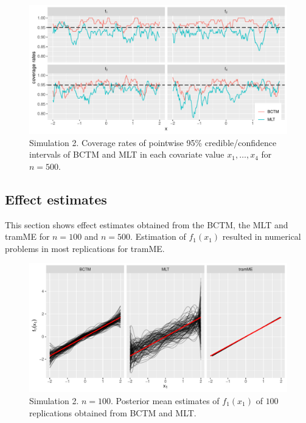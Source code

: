 \documentclass[12pt, a4paper]{article}
\begin{document}
\begin{figure}
\centering
\includegraphics[width=\textwidth]{figs/coverages_n500.pdf}
\caption{\footnotesize Simulation 2. Coverage rates of pointwise 95\% credible/confidence intervals of BCTM and MLT in each covariate value $x_1, \ldots, x_4$ for $n=500$.}\label{fig:cov2}
\end{figure}


\clearpage
\subsection{Effect estimates}
This section shows effect estimates obtained from the BCTM, the MLT and tramME for $n=100$ and $n=500$. Estimation of $f_1(x_1)$ resulted in numerical problems in most replications for tramME.
\begin{figure}[!ht]
\begin{center}
\includegraphics[width=\textwidth]{figs/coverage_f1_n100_wtramme.pdf}
\caption{\footnotesize Simulation 2. $n=100$. Posterior mean estimates of $f_1(x_1)$ of $100$ replications obtained from BCTM and MLT.}\label{fig:eff1_n100}
\end{center}
\end{figure}
\end{document}
